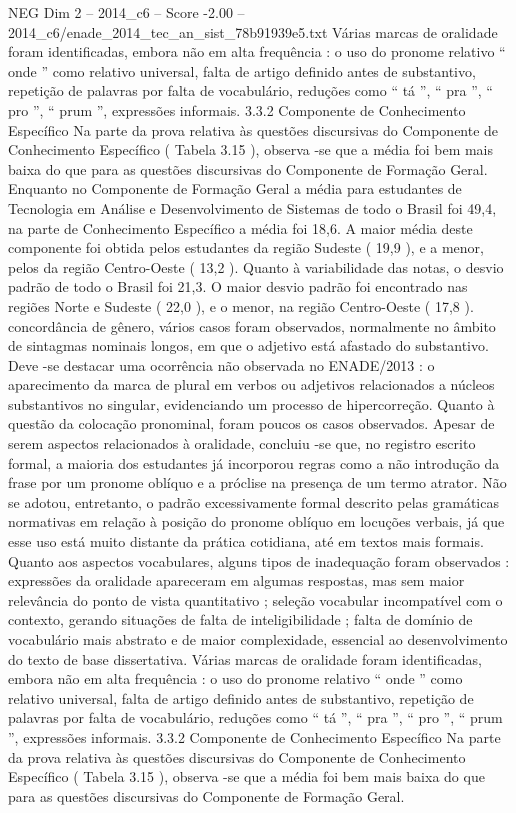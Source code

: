 \begin{textsample}{NEG Dim 2 – 2014\_c6 – Score -2.00 – 2014\_c6/enade\_2014\_tec\_an\_sist\_78b91939e5.txt}
Várias marcas de oralidade foram identificadas, embora não em alta frequência : o uso do pronome relativo “ onde ” como relativo universal, falta de artigo definido antes de substantivo, repetição de palavras por falta de vocabulário, reduções como “ tá ”, “ pra ”, “ pro ”, “ prum ”, expressões informais. 3.3.2 Componente de Conhecimento Específico Na parte da prova relativa às questões discursivas do Componente de Conhecimento Específico ( Tabela 3.15 ), observa -se que a média foi bem mais baixa do que para as questões discursivas do Componente de Formação Geral.
Enquanto no Componente de Formação Geral a média para estudantes de Tecnologia em Análise e Desenvolvimento de Sistemas de todo o Brasil foi 49,4, na parte de Conhecimento Específico a média foi 18,6.
A maior média deste componente foi obtida pelos estudantes da região Sudeste ( 19,9 ), e a menor, pelos da região Centro-Oeste ( 13,2 ).
Quanto à variabilidade das notas, o desvio padrão de todo o Brasil foi 21,3.
O maior desvio padrão foi encontrado nas regiões Norte e Sudeste ( 22,0 ), e o menor, na região Centro-Oeste ( 17,8 ). concordância de gênero, vários casos foram observados, normalmente no âmbito de sintagmas nominais longos, em que o adjetivo está afastado do substantivo.
Deve -se destacar uma ocorrência não observada no ENADE/2013 : o aparecimento da marca de plural em verbos ou adjetivos relacionados a núcleos substantivos no singular, evidenciando um processo de hipercorreção.
Quanto à questão da colocação pronominal, foram poucos os casos observados.
Apesar de serem aspectos relacionados à oralidade, concluiu -se que, no registro escrito formal, a maioria dos estudantes já incorporou regras como a não introdução da frase por um pronome oblíquo e a próclise na presença de um termo atrator.
Não se adotou, entretanto, o padrão excessivamente formal descrito pelas gramáticas normativas em relação à posição do pronome oblíquo em locuções verbais, já que esse uso está muito distante da prática cotidiana, até em textos mais formais.
Quanto aos aspectos vocabulares, alguns tipos de inadequação foram observados : expressões da oralidade apareceram em algumas respostas, mas sem maior relevância do ponto de vista quantitativo ; seleção vocabular incompatível com o contexto, gerando situações de falta de inteligibilidade ; falta de domínio de vocabulário mais abstrato e de maior complexidade, essencial ao desenvolvimento do texto de base dissertativa.
Várias marcas de oralidade foram identificadas, embora não em alta frequência : o uso do pronome relativo “ onde ” como relativo universal, falta de artigo definido antes de substantivo, repetição de palavras por falta de vocabulário, reduções como “ tá ”, “ pra ”, “ pro ”, “ prum ”, expressões informais. 3.3.2 Componente de Conhecimento Específico Na parte da prova relativa às questões discursivas do Componente de Conhecimento Específico ( Tabela 3.15 ), observa -se que a média foi bem mais baixa do que para as questões discursivas do Componente de Formação Geral.

\end{textsample}
